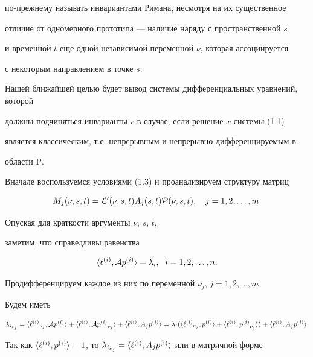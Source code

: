 по-прежнему называть инвариантами Римана, несмотря на их существенное 


отличие от одномерного прототипа --- наличие наряду с пространственной $s$ 


и временной $t$ еще одной независимой переменной $\nu$, которая ассоциируется


с некоторым направлением в точке $s$.





Нашей ближайшей целью будет вывод системы дифференциальных уравнений, которой


должны подчиняться инварианты $r$ в случае, если решение $x$ системы (1.1)


является классическим, т.е. непрерывным и непрерывно дифференцируемым в 


области $\mathrm P$.





Вначале воспользуемся условиями (1.3) и проанализируем структуру матриц 


$$


M_j (\nu,s,t)={\cal L}^{\prime}(\nu,s,t) A_j(s,t){\cal P}(\nu,s,t),


\quad j=1,2,\dotsc,m.


$$


Опуская для краткости аргументы $\nu$, $s$, $t$,


заметим, что справедливы равенства


$$


\la \ell^{(i)}, {\cal A} p^{(i)} \ra=\lambda_i,\ \; i=1,2,\dotsc,n.


$$


Продифференцируем каждое из них по переменной $\nu_j$, $j=1,2,\dotsc,m$.


Будем иметь


$$


\lambda_{i_{\nu_j}}=\la {\ell^{(i)}}_{\nu_j}, {\cal A} p^{(i)} \ra+


\la\ell^{(i)}, {\cal A} {p^{(i)}}_{\nu_j}\ra+\la\ell^{(i)}, A_j p^{(i)}\ra=


{\lambda_i} (\la {\ell^{(i)}}_{\nu_j}, p^{(i)} \ra+


\la\ell^{(i)}, {p^{(i)}}_{\nu_j}\ra)+\la\ell^{(i)}, A_j p^{(i)} \ra.


$$


Так как $\la {\ell^{(i)}},p^{(i)} \ra \equiv 1$, то $\lambda_{i_{\nu_j}}=


\la\ell^{(i)}, A_j p^{(i)}\ra$ или в матричной форме


